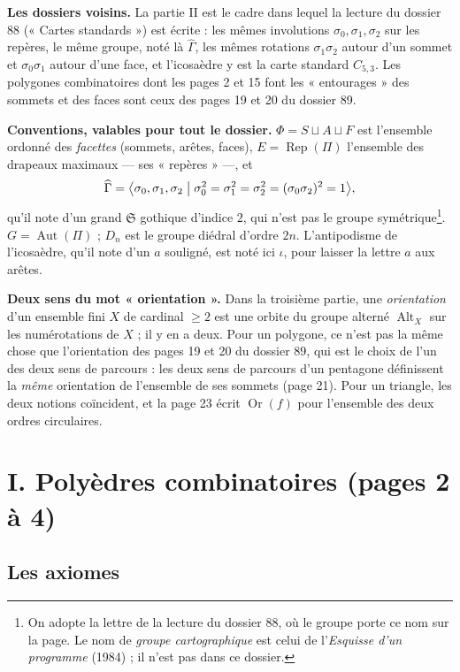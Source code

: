 \documentclass[11pt,a4paper]{article}
\begin{document}
\textbf{Les dossiers voisins.} La partie II est le cadre dans lequel la
lecture du dossier 88 (« Cartes standards ») est écrite : les mêmes
involutions $\sigma_0, \sigma_1, \sigma_2$ sur les repères, le même groupe,
noté là $\widehat{\Gamma}$, les mêmes rotations $\sigma_1\sigma_2$ autour d'un
sommet et $\sigma_0\sigma_1$ autour d'une face, et l'icosaèdre y est la carte
standard $C_{5,3}$. Les polygones combinatoires dont les pages 2 et 15 font les
« entourages » des sommets et des faces sont ceux des pages 19 et 20 du
dossier 89.

\textbf{Conventions, valables pour tout le dossier.} $\Phi = S \sqcup A \sqcup
F$ est l'ensemble ordonné des \emph{facettes} (sommets, arêtes, faces),
$E = \operatorname{Rep}(\Pi)$ l'ensemble des drapeaux maximaux --- ses
« repères » ---, et
\[
\widehat{\Gamma} = \bigl\langle \sigma_0, \sigma_1, \sigma_2 \bigm|
\sigma_0^2 = \sigma_1^2 = \sigma_2^2 = (\sigma_0\sigma_2)^2 = 1 \bigr\rangle ,
\]
qu'il note d'un grand $\mathfrak{S}$ gothique d'indice $2$, qui n'est pas le
groupe symétrique\footnote{On adopte la lettre de la lecture du dossier 88,
où le groupe porte ce nom sur la page. Le nom de \emph{groupe cartographique}
est celui de l'\emph{Esquisse d'un programme} (1984) ; il n'est pas dans ce
dossier.}. $G = \operatorname{Aut}(\Pi)$ ; $D_n$ est le groupe diédral
d'ordre $2n$. L'antipodisme de l'icosaèdre, qu'il note d'un $a$ souligné, est
noté ici $\iota$, pour laisser la lettre $a$ aux arêtes.

\textbf{Deux sens du mot « orientation ».} Dans la troisième partie, une
\emph{orientation} d'un ensemble fini $X$ de cardinal $\geq 2$ est une orbite
du groupe alterné $\operatorname{Alt}_X$ sur les numérotations de $X$ ; il y en
a deux. Pour un polygone, ce n'est pas la même chose que l'orientation des
pages 19 et 20 du dossier 89, qui est le choix de l'un des deux sens de
parcours : les deux sens de parcours d'un pentagone définissent la
\emph{même} orientation de l'ensemble de ses sommets (page 21). Pour un
triangle, les deux notions coïncident, et la page 23 écrit
$\operatorname{Or}(f)$ pour l'ensemble des deux ordres circulaires.

\section*{I. Polyèdres combinatoires (pages 2 à 4)}

\subsection*{Les axiomes}
\end{document}
